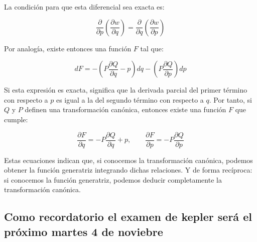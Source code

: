 \documentclass{article}
\begin{document}
La condición para que esta diferencial sea exacta es:

\[
\frac{\partial}{\partial p}
\!\left(
\frac{\partial w}{\partial q}
\right)
=
\frac{\partial}{\partial q}
\!\left(
\frac{\partial w}{\partial p}
\right)
\]

Por analogía, existe entonces una función \( F \) tal que:

\[
dF =
- \!\left( P\frac{\partial Q}{\partial q} - p \right)\!dq
- \!\left( P\frac{\partial Q}{\partial p} \right)\!dp
\]

Si esta expresión es exacta, significa que la derivada parcial del primer término con respecto a \( p \) es igual a la del segundo término con respecto a \( q \).  
Por tanto, si \( Q \) y \( P \) definen una transformación canónica, entonces existe una función \( F \) que cumple:

\[
\frac{\partial F}{\partial q} = -P\frac{\partial Q}{\partial q} + p,
\qquad
\frac{\partial F}{\partial p} = -P\frac{\partial Q}{\partial p}
\]

Estas ecuaciones indican que, si conocemos la transformación canónica, podemos obtener la función generatriz integrando dichas relaciones.  
Y de forma recíproca: si conocemos la función generatriz, podemos deducir completamente la transformación canónica.

\subsection{Como recordatorio el examen de kepler será el próximo martes 4 de noviebre}
\end{document}
